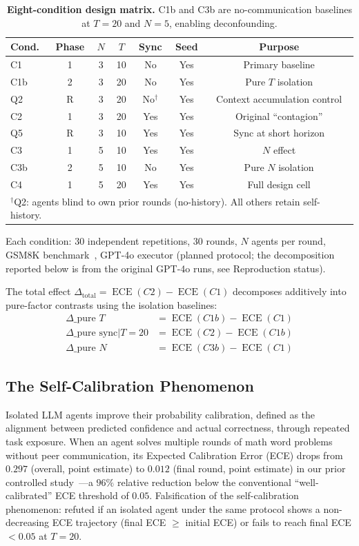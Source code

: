 \documentclass[11pt]{article}
\DeclareMathOperator{\ECE}{ECE}
\begin{document}
\begin{table}[H]
\centering
\caption{\textbf{Eight-condition design matrix.} C1b and C3b are no-communication baselines at $T{=}20$ and $N{=}5$, enabling deconfounding.}
\label{tab:design}
\begin{tabular}{@{}lcccccc@{}}
\toprule
Cond. & Phase & $N$ & $T$ & Sync & Seed & Purpose \\
\midrule
C1  & 1 & 3 & 10 & No  & Yes & Primary baseline \\
C1b & 2 & 3 & 20 & No  & Yes & Pure $T$ isolation \\
Q2  & R & 3 & 20 & No$^\dagger$ & Yes & Context accumulation control \\
C2  & 1 & 3 & 20 & Yes & Yes & Original ``contagion'' \\
Q5  & R & 3 & 10 & Yes & Yes & Sync at short horizon \\
C3  & 1 & 5 & 10 & Yes & Yes & $N$ effect \\
C3b & 2 & 5 & 10 & No  & Yes & Pure $N$ isolation \\
C4  & 1 & 5 & 20 & Yes & Yes & Full design cell \\
\bottomrule
\multicolumn{7}{l}{\footnotesize $^\dagger$Q2: agents blind to own prior rounds (no-history). All others retain self-history.} \\
\end{tabular}
\end{table}

Each condition: 30 independent repetitions, 30 rounds, $N$ agents per round, GSM8K benchmark~\citep{cobbe2021gsm8k}, GPT-4o executor (planned protocol; the decomposition reported below is from the original GPT-4o runs, see Reproduction status).

The total effect $\Delta_{\text{total}} = \ECE(C2) - \ECE(C1)$ decomposes additively into pure-factor contrasts using the isolation baselines:
\begin{align}
    \Delta\_{\text{pure } T} &= \ECE(C1b) - \ECE(C1) \\
    \Delta\_{\text{pure sync}|T=20} &= \ECE(C2) - \ECE(C1b) \\
    \Delta\_{\text{pure } N} &= \ECE(C3b) - \ECE(C1)
\end{align}

\subsection{The Self-Calibration Phenomenon}

Isolated LLM agents improve their probability calibration, defined as the alignment between predicted confidence and actual correctness, through repeated task exposure. When an agent solves multiple rounds of math word problems without peer communication, its Expected Calibration Error (ECE) drops from $0.297$ (overall, point estimate) to $0.012$ (final round, point estimate) in our prior controlled study~\cite{calibration2026}---a $96\%$ relative reduction below the conventional ``well-calibrated'' ECE threshold of $0.05$. Falsification of the self-calibration phenomenon: refuted if an isolated agent under the same protocol shows a non-decreasing ECE trajectory (final ECE $\geq$ initial ECE) or fails to reach final ECE $< 0.05$ at $T = 20$.
\end{document}
